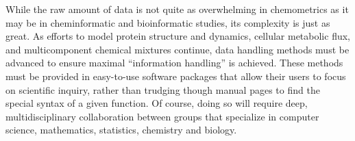 \begin{doublespace}
While the raw amount of data is not quite as overwhelming in chemometrics as
it may be in cheminformatic and bioinformatic studies, its complexity is just
as great. As efforts to model protein structure and dynamics, cellular
metabolic flux, and multicomponent chemical mixtures continue, data handling
methods must be advanced to ensure maximal ``information handling'' is
achieved. These methods must be provided in easy-to-use software packages
that allow their users to focus on scientific inquiry, rather than trudging
though manual pages to find the special syntax of a given function. Of course,
doing so will require deep, multidisciplinary collaboration between groups
that specialize in computer science, mathematics, statistics, chemistry and
biology.
\end{doublespace}





